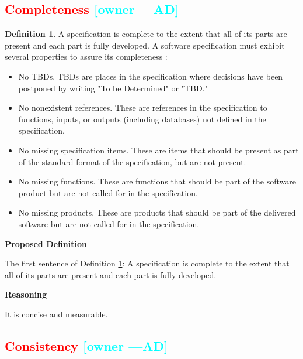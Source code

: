 \documentclass[letterpaper,cleveref]{lipics-v2019}
\newcommand{\authornote}[3]{\textcolor{#1}{[#3 ---#2]}}
\newcommand{\authornote}[3]{}
\newcommand{\ad}[1]{\authornote{cyan}{AD}{#1}} %
\newcommand{\notdone}[1]{\textcolor{red}{#1}}
\theoremstyle{definition}
\newtheorem{defn}{Definition}
\begin{document}
\subsection{\notdone{Completeness} \ad{owner}}

\begin{defn}
\label{CompletenessSelected}
A specification is complete to the extent that all of its parts are present and
each part is fully developed. A software specification must exhibit several
properties to assure its completeness \citep{Boehm1984}:
\begin{itemize}
\item No TBDs. TBDs are places in the specification where decisions have been
postponed by writing "To be Determined" or "TBD."
\item No nonexistent references. These are references in the specification to
functions, inputs, or outputs (including databases) not defined in the
specification.
\item No missing specification items. These are items that should be present as
part of the standard format of the specification, but are not present.
\item No missing functions. These are functions that should be part of the
software product but are not called for in the specification.
\item No missing products. These are products that should be part of the
delivered software but are not called for in the specification.
\end{itemize}
\end{defn}

\noindent \textbf{Proposed Definition} 

The first sentence of Definition \ref{CompletenessSelected}: A specification is
complete to the extent that all of its parts are present and each part is fully
developed.

\noindent \textbf{Reasoning}

It is concise and measurable.

\subsection{\notdone{Consistency} \ad{owner}}
\end{document}
